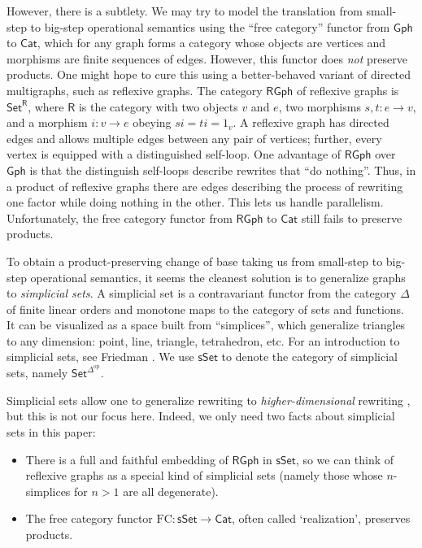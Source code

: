 \documentclass{amsart}
\theoremstyle{definition}
\newcommand{\sSet}{\mathsf{sSet}}
\newcommand{\RGph}{\mathsf{RGph}}
\newcommand{\Gph}{\mathsf{Gph}}
\newcommand{\Set}{\mathsf{Set}}
\newcommand{\Cat}{\mathsf{Cat}}
\newcommand{\R}{\mathsf{R}}
\newcommand{\FC}{\mathrm{FC}}
\newcommand{\op}{\mathrm{op}}
\newcommand{\maps}{\colon}
\begin{document}
However, there is a subtlety.  We may try to model the translation from small-step to big-step operational semantics using the ``free category'' functor from $\Gph$ to $\Cat$, which for any graph forms a category whose objects are vertices and morphisms are finite sequences of edges.   However, this functor does \emph{not} preserve products.   One might hope to cure this using a better-behaved variant of directed multigraphs, such as reflexive graphs.   The category $\RGph$ of reflexive graphs is $\Set^\R$, where $\R$ is the category with two objects $v$ and $e$, two morphisms $s,t \maps e \to v$, and a morphism $i \maps v \to e$ obeying $si = ti = 1_v$.   A reflexive graph has directed edges and allows multiple edges between any pair of vertices; further, every vertex is equipped with a distinguished self-loop.   One advantage of $\RGph$ over $\Gph$ is that the distinguish self-loops describe rewrites that ``do nothing''.  Thus, in a product of reflexive graphs there are edges describing the process of rewriting one factor while doing nothing in the other.  This lets us handle parallelism.  Unfortunately, the free category functor from $\RGph$ to $\Cat$ still fails to preserve products.

To obtain a product-preserving change of base taking us from small-step to big-step operational semantics, it seems the cleanest solution is to generalize graphs to \emph{simplicial sets}.  A simplicial set is a contravariant functor from the category $\Delta$ of finite linear orders and monotone maps to the category of sets and functions.  It can be visualized as a space built from ``simplices'', which generalize triangles to any dimension: point, line, triangle, tetrahedron, etc. For an introduction to simplicial sets, see Friedman \cite{sset}.  We use $\sSet$ to denote the category of simplicial sets, namely $\Set^{\Delta^{\op}}$.

Simplicial sets allow one to generalize rewriting to \emph{higher-dimensional} rewriting \cite{hdra}, but this is not our focus here.  Indeed, we only need two facts about simplicial sets in this paper:

\begin{itemize}
\item There is a full and faithful embedding of $\RGph$ in $\sSet$, so we can think of reflexive graphs as a special kind of simplicial sets (namely those whose $n$-simplices for $n > 1$ are all degenerate).
\item The free category functor $\FC \maps \sSet \to \Cat$, often called `realization', preserves products.
\end{itemize}
\end{document}

